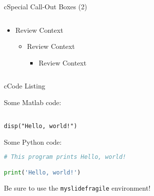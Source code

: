 \begin{myslide}{c}{Special Call-Out Boxes (2)}

\begin{columns}

\begin{column}{1\textwidth}

\begin{itemize}

\item[]
\begin{myoptional}
\lipsum[1][1-6]
\end{myoptional}

\begin{myreview}{Review Context}
\lipsum[2][1-3]
\end{myreview}

\begin{itemize}

\item[]
\begin{myreview}{Review Context}
\lipsum[2][1-3]
\end{myreview}

\begin{itemize}

\item[]
\begin{myreview}{Review Context}
\lipsum[2][1-3]
\end{myreview}

\end{itemize}

\end{itemize}

\end{itemize}

\end{column}

\end{columns}

\end{myslide}

\begin{myslidefragile}{c}{Code Listing}

Some Matlab code:
\begin{lstlisting}[xleftmargin=0pt]
% This program prints Hello, world!

disp("Hello, world!")
\end{lstlisting}

Some Python code:
\begin{lstlisting}[xleftmargin=0pt,language=Python]
# This program prints Hello, world!

print('Hello, world!')
\end{lstlisting}

Be sure to use the \lstinline{myslidefragile} environment!

\end{myslidefragile}